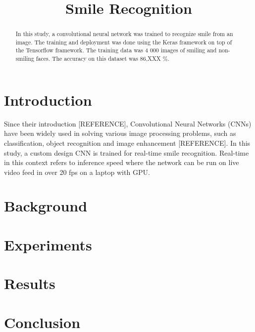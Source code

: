 \documentclass{article}
\title{Smile Recognition}
\begin{document}
\maketitle
\sloppy

\begin{abstract}
In this study, a convolutional neural network was trained to recognize
smile from an image. The training and deployment was done using the
Keras framework on top of the Tensorflow framework. The training data
was 4 000 images of smiling and non-smiling faces. The accuracy on
this dataset was 86,XXX \%.
\end{abstract}

\section{Introduction}
\label{sec:intro}
Since their introduction [REFERENCE], Convolutional Neural Networks
(CNNs) have been widely used in solving various image processing
problems, such as classification, object recognition and image
enhancement [REFERENCE]. In this study, a custom design CNN is trained
for real-time smile recognition. Real-time in this context refers to
inference speed where the network can be run on live video feed in
over 20 fps on a laptop with GPU\@.

\section{Background}
\label{sec:background}
\section{Experiments}

\section{Results}
\label{sec:results}

\section{Conclusion}
\label{sec:conclusion}

\small




%

\vfill\pagebreak
\end{document}
